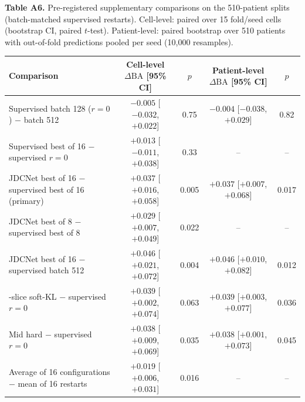 \documentclass[pdflatex,sn-vancouver,Numbered]{sn-jnl}
\begin{document}
\begin{minipage}{\textwidth}
{\small\noindent\textbf{Table A6.} Pre-registered supplementary comparisons on the 510-patient splits (batch-matched supervised restarts). Cell-level: paired over 15 fold/seed cells (bootstrap CI, paired $t$-test). Patient-level: paired bootstrap over 510 patients with out-of-fold predictions pooled per seed (10{,}000 resamples).\par}
\vspace{6pt}


\centering
\scriptsize
\setlength{\tabcolsep}{2.0pt}
\renewcommand{\arraystretch}{0.92}
\begin{tabularx}{\columnwidth}{@{}>{\raggedright\arraybackslash}Xcccc@{}}
\toprule
Comparison & Cell-level $\Delta\mathrm{BA}$ [95\% CI] & $p$ & Patient-level $\Delta\mathrm{BA}$ [95\% CI] & $p$ \\
\midrule
Supervised batch 128 ($r{=}0$) $-$ batch 512 & $-0.005$ [$-0.032$, $+0.022$] & 0.75 & $-0.004$ [$-0.038$, $+0.029$] & 0.82 \\
Supervised best of 16 $-$ supervised $r{=}0$ & $+0.013$ [$-0.011$, $+0.038$] & 0.33 & -- & -- \\
JDCNet best of 16 $-$ supervised best of 16 (primary) & $+0.037$ [$+0.016$, $+0.058$] & 0.005 & $+0.037$ [$+0.007$, $+0.068$] & 0.017 \\
JDCNet best of 8 $-$ supervised best of 8 & $+0.029$ [$+0.007$, $+0.049$] & 0.022 & -- & -- \\
JDCNet best of 16 $-$ supervised batch 512 & $+0.046$ [$+0.021$, $+0.072$] & 0.004 & $+0.046$ [$+0.010$, $+0.082$] & 0.012 \\
3-slice soft-KL $-$ supervised $r{=}0$ & $+0.039$ [$+0.002$, $+0.074$] & 0.063 & $+0.039$ [$+0.003$, $+0.077$] & 0.036 \\
Mid hard $-$ supervised $r{=}0$ & $+0.038$ [$+0.009$, $+0.069$] & 0.035 & $+0.038$ [$+0.001$, $+0.073$] & 0.045 \\
Average of 16 configurations $-$ mean of 16 restarts & $+0.019$ [$+0.006$, $+0.031$] & 0.016 & -- & -- \\
\bottomrule
\end{tabularx}
\end{minipage}
\clearpage
\end{document}
